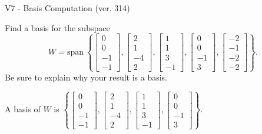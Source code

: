\begin{exercise}
  \begin{exerciseTitle}V7 - Basis Computation (ver. 314)\end{exerciseTitle}
  \begin{exerciseStatement}
    Find a basis for the subspace 
\[W=\mathrm{span}\ \left\{\left[\begin{array}{r}
0 \\
0 \\
-1 \\
-1
\end{array}\right] , \left[\begin{array}{r}
2 \\
1 \\
-4 \\
2
\end{array}\right] , \left[\begin{array}{r}
1 \\
1 \\
3 \\
-1
\end{array}\right] , \left[\begin{array}{r}
0 \\
0 \\
-1 \\
3
\end{array}\right] , \left[\begin{array}{r}
-2 \\
-1 \\
-2 \\
-2
\end{array}\right]\right\}.\]
 Be sure to explain why your result is a basis.


  \end{exerciseStatement}
  \begin{exerciseAnswer}
   A basis of \(W\) is  \(\left\{\left[\begin{array}{r}
0 \\
0 \\
-1 \\
-1
\end{array}\right] , \left[\begin{array}{r}
2 \\
1 \\
-4 \\
2
\end{array}\right] , \left[\begin{array}{r}
1 \\
1 \\
3 \\
-1
\end{array}\right] , \left[\begin{array}{r}
0 \\
0 \\
-1 \\
3
\end{array}\right]\right\}\).
  


  \end{exerciseAnswer}
\end{exercise}